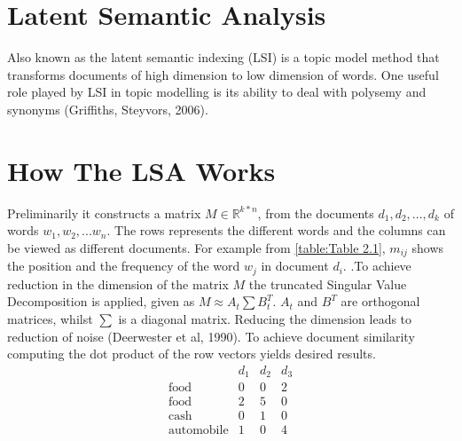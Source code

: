 
\section{Latent Semantic Analysis} 
Also known as the latent semantic indexing (LSI) is a topic model method
that transforms documents of high dimension to low dimension of words. One useful role played by LSI in topic modelling is its ability to deal with polysemy and synonyms (Griffiths, Steyvors, 2006).
\section{How The LSA Works}
Preliminarily it constructs a matrix $M\in \mathbb{R}^{k*n}$, from the documents $d_1, d_2,..., d_k$ of words $w_1, w_2, ... w_n$. The rows represents the different words and the columns can be viewed as different documents.
For example from \eqref{table:Table 2.1}, $m_{ij}$ shows the position and the frequency of the word $w_j$ in document $d_i$.
.To achieve reduction in the dimension of the matrix $M$ the truncated Singular Value Decomposition is applied, given as $M\approx A_t \sum B^{T}_t.$
$A_t$ and $B^T$ are orthogonal matrices, whilst $ \sum$ is a diagonal matrix.
Reducing the dimension leads to reduction of noise (Deerwester et al, 1990).
To achieve document similarity computing the dot product of the row vectors yields desired results. 
$$\begin{array}{cccc}
 &d_1 & d_2 &d_3 \\ 
 \text{food} & 0 & 0 & 2 \\ 
 \text{food} & 2 & 5 & 0 \\ 
 \text{cash} & 0 & 1 & 0 \\ 
 \text{automobile} & 1 & 0 & 4
  \end{array} $$
